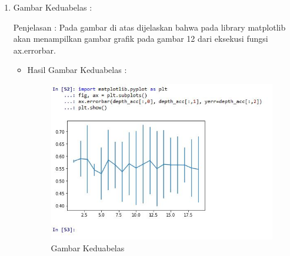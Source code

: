 \begin{itemize}
\begin{enumerate}
\begin{itemize}
\end{itemize}
\item  Gambar Keduabelas :
\par Penjelasan : Pada gambar di atas dijelaskan bahwa pada library matplotlib akan menampilkan gambar grafik pada gambar 12 dari eksekusi fungsi ax.errorbar.
\par 
\begin{itemize}
\par
\item Hasil  Gambar Keduabelas :

\begin{figure}[ht]
\centering
\includegraphics[scale=0.5]{figures/12.jpg}
\caption{ Gambar Keduabelas}
\label{12}
\end{figure}


\end{itemize}
\end{enumerate}

\end{itemize}

